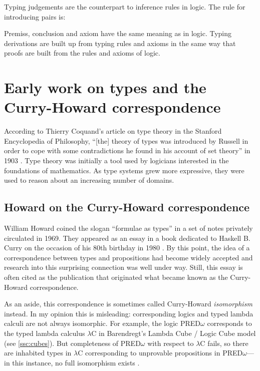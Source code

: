 \documentclass[12pt,toc=bibliography,numbers=noendperiod,
               footnotes=multiple,twoside]{scrartcl}
\begin{document}
Typing judgements are the counterpart to inference rules in logic. The rule for introducing pairs is:

\begin{figure}[h]
\begin{prooftree}
\end{prooftree}
\end{figure}

Premiss, conclusion and axiom have the same meaning as in logic. Typing derivations are built up from typing rules and axioms in the same way that proofs are built from the rules and axioms of logic.

\section{Early work on types and the Curry-Howard correspondence}

According to Thierry Coquand's article on type theory in the Stanford Encyclopedia of Philosophy, \enquote{[the] theory of types was introduced by Russell in order to cope with some contradictions he found in his account of set theory} in 1903 \autocite{coquand_type_2014}. Type theory was initially a tool used by logicians interested in the foundations of mathematics. As type systems grew more expressive, they were used to reason about an increasing number of domains.

\subsection{Howard on the Curry-Howard correspondence}

William Howard coined the slogan \enquote{formulae as types} in a set of notes privately circulated in 1969. They appeared as an essay in a book dedicated to Haskell B. Curry on the occasion of his 80th birthday in 1980 \autocite{howard_formulae-as-types_1980}. By this point, the idea of a correspondence between types and propositions had become widely accepted and research into this surprising connection was well under way. Still, this essay is often cited as the publication that originated what became known as the Curry-Howard correspondence.

As an aside, this correspondence is sometimes called Curry-Howard \emph{isomorphism} instead. In my opinion this is misleading: corresponding logics and typed lambda calculi are not always isomorphic. For example, the logic PRED\(\omega\) corresponds to the typed lambda calculus \(\lambda\)C in Barendregt's Lambda Cube / Logic Cube model (see \cref{ssc:cubes}). But completeness of PRED\(\omega\) with respect to \(\lambda\)C fails, so there are inhabited types in \(\lambda\)C corresponding to unprovable propositions in PRED\(\omega\)---in this instance, no full isomorphism exists \autocite[250]{barendregt_lambda_1992}.
\end{document}
